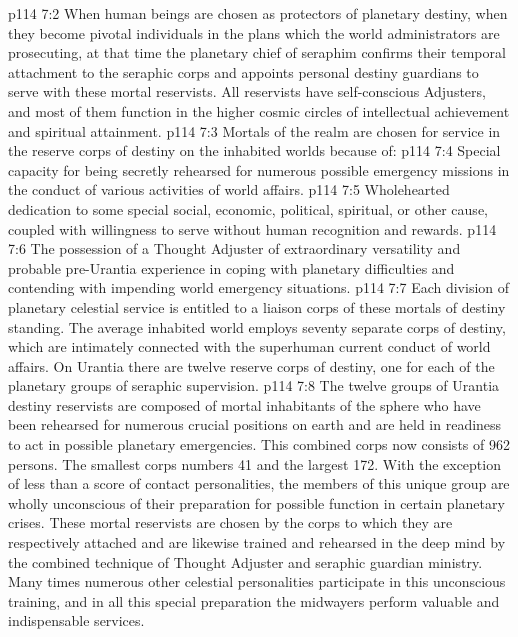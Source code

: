 \vs p114 7:2 When human beings are chosen as protectors of planetary destiny, when they become pivotal individuals in the plans which the world administrators are prosecuting, at that time the planetary chief of seraphim confirms their temporal attachment to the seraphic corps and appoints personal destiny guardians to serve with these mortal reservists. All reservists have self\hyp{}conscious Adjusters, and most of them function in the higher cosmic circles of intellectual achievement and spiritual attainment.
\vs p114 7:3 Mortals of the realm are chosen for service in the reserve corps of destiny on the inhabited worlds because of:
\pc \vs p114 7:4 \bibnobreakspace Special capacity for being secretly rehearsed for numerous possible emergency missions in the conduct of various activities of world affairs.
\vs p114 7:5 \bibnobreakspace Wholehearted dedication to some special social, economic, political, spiritual, or other cause, coupled with willingness to serve without human recognition and rewards.
\vs p114 7:6 \bibnobreakspace The possession of a Thought Adjuster of extraordinary versatility and probable pre\hyp{}Urantia experience in coping with planetary difficulties and contending with impending world emergency situations.
\pc \vs p114 7:7 Each division of planetary celestial service is entitled to a liaison corps of these mortals of destiny standing. The average inhabited world employs seventy separate corps of destiny, which are intimately connected with the superhuman current conduct of world affairs. On Urantia there are twelve reserve corps of destiny, one for each of the planetary groups of seraphic supervision.
\vs p114 7:8 The twelve groups of Urantia destiny reservists are composed of mortal inhabitants of the sphere who have been rehearsed for numerous crucial positions on earth and are held in readiness to act in possible planetary emergencies. This combined corps now consists of 962 persons. The smallest corps numbers 41 and the largest 172. With the exception of less than a score of contact personalities, the members of this unique group are wholly unconscious of their preparation for possible function in certain planetary crises. These mortal reservists are chosen by the corps to which they are respectively attached and are likewise trained and rehearsed in the deep mind by the combined technique of Thought Adjuster and seraphic guardian ministry. Many times numerous other celestial personalities participate in this unconscious training, and in all this special preparation the midwayers perform valuable and indispensable services.
